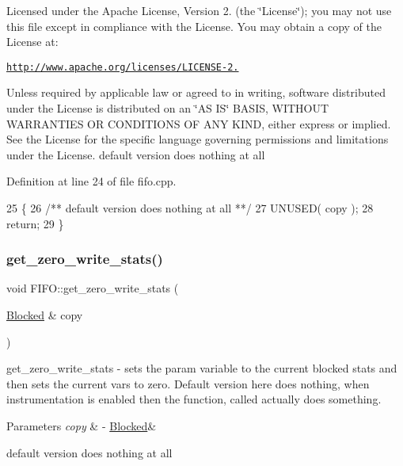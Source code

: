 Licensed under the Apache License, Version 2. (the \char`\"{}\+License\char`\"{}); you may not use this file except in compliance with the License. You may obtain a copy of the License at\+:

\href{http://www.apache.org/licenses/LICENSE-2.0}{\tt http\+://www.\+apache.\+org/licenses/\+L\+I\+C\+E\+N\+S\+E-\/2.}

Unless required by applicable law or agreed to in writing, software distributed under the License is distributed on an \char`\"{}\+A\+S I\+S\char`\"{} B\+A\+S\+IS, W\+I\+T\+H\+O\+UT W\+A\+R\+R\+A\+N\+T\+I\+ES OR C\+O\+N\+D\+I\+T\+I\+O\+NS OF A\+NY K\+I\+ND, either express or implied. See the License for the specific language governing permissions and limitations under the License. default version does nothing at all 

Definition at line 24 of file fifo.\+cpp.


\begin{DoxyCode}
25 \{\textcolor{comment}{}
26 \textcolor{comment}{   /** default version does nothing at all **/}
27    UNUSED( copy ); 
28    \textcolor{keywordflow}{return};
29 \}
\end{DoxyCode}
\hypertarget{class_f_i_f_o_a6dd419cc4b99bd13f6b018145844bdd2}{}\label{class_f_i_f_o_a6dd419cc4b99bd13f6b018145844bdd2} 
\subsubsection{\texorpdfstring{get\+\_\+zero\+\_\+write\+\_\+stats()}{get\_zero\_write\_stats()}}
{\footnotesize\ttfamily void F\+I\+F\+O\+::get\+\_\+zero\+\_\+write\+\_\+stats (\begin{DoxyParamCaption}\item[{\hyperlink{struct_blocked}{Blocked} \&}]{copy }\end{DoxyParamCaption})\hspace{0.3cm}{\ttfamily [virtual]}}

get\+\_\+zero\+\_\+write\+\_\+stats -\/ sets the param variable to the current blocked stats and then sets the current vars to zero. Default version here does nothing, when instrumentation is enabled then the function, called actually does something. 
\begin{DoxyParams}{Parameters}
{\em copy} & -\/ \hyperlink{struct_blocked}{Blocked}\& \\
\hline
\end{DoxyParams}
default version does nothing at all 

